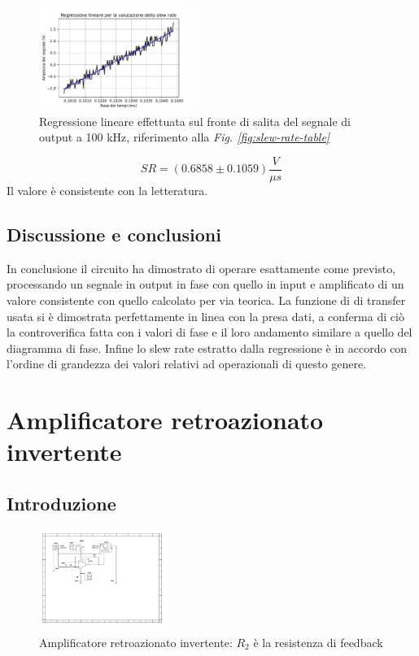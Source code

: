 \documentclass[journal]{IEEEtran}
\begin{document}
\begin{figure}[H]%
\begin {center}
\includegraphics[width=0.45\textwidth]{analysis/output/OPA-slew-rate-fit.pdf}
\caption{Regressione lineare effettuata sul fronte di salita del segnale di output a 100 kHz, riferimento alla \textit{Fig. \ref{fig:slew-rate-table}}}
\label{fig:slew-rate-fit}
\end {center}
\end{figure}
\[SR = (0.6858 \pm 0.1059) \frac{V}{\mu s}\]
Il valore è consistente con la letteratura.
\subsection{\textbf{Discussione e conclusioni}}
In conclusione il circuito ha dimostrato di operare esattamente come previsto, processando un segnale in output in fase con quello in input e amplificato di un valore consistente con quello calcolato per via teorica. La funzione di di transfer usata si è dimostrata perfettamente in linea con la presa dati, a conferma di ciò la controverifica fatta con i valori di fase e il loro andamento similare a quello del diagramma di fase. Infine lo slew rate estratto dalla regressione è in accordo con l'ordine di grandezza dei valori relativi ad operazionali di questo genere. 

\section{\textbf{Amplificatore retroazionato invertente}} %
\subsection{\textbf{Introduzione}}
\begin{figure}[H]%
\begin {center}
\includegraphics[width=0.38\textwidth]{sch-simulations/output/OPA-closed-loop-inverting.pdf}
\caption{Amplificatore retroazionato invertente: $R_2$ è la resistenza di feedback}
\label{fig:circ_closed_loop_inv}
\end {center}
\end{figure}
\end{document}
